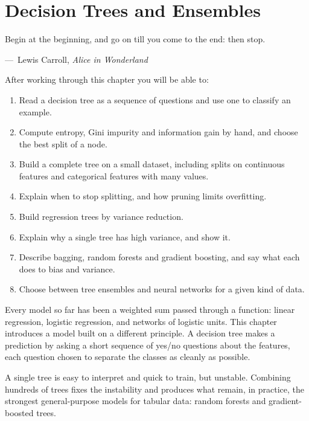 
\chapter{Decision Trees and Ensembles}
\label{ch:ch12}

\epigraph{Begin at the beginning, and go on till you come to the end: then
stop.}{---\ Lewis Carroll, \emph{Alice in Wonderland}}

\begin{chapterlearning}
After working through this chapter you will be able to:
\begin{enumerate}
  \item Read a decision tree as a sequence of questions and use one to classify
        an example.
  \item Compute entropy, Gini impurity and information gain by hand, and choose
        the best split of a node.
  \item Build a complete tree on a small dataset, including splits on continuous
        features and categorical features with many values.
  \item Explain when to stop splitting, and how pruning limits overfitting.
  \item Build regression trees by variance reduction.
  \item Explain why a single tree has high variance, and show it.
  \item Describe bagging, random forests and gradient boosting, and say what each
        does to bias and variance.
  \item Choose between tree ensembles and neural networks for a given kind of
        data.
\end{enumerate}
\end{chapterlearning}

Every model so far has been a weighted sum passed through a function: linear
regression, logistic regression, and networks of logistic units. This chapter
introduces a model built on a different principle. A decision tree makes a
prediction by asking a short sequence of yes/no questions about the features,
each question chosen to separate the classes as cleanly as possible.

A single tree is easy to interpret and quick to train, but unstable. Combining
hundreds of trees fixes the instability and produces what remain, in practice,
the strongest general-purpose models for tabular data: random forests and
gradient-boosted trees.

